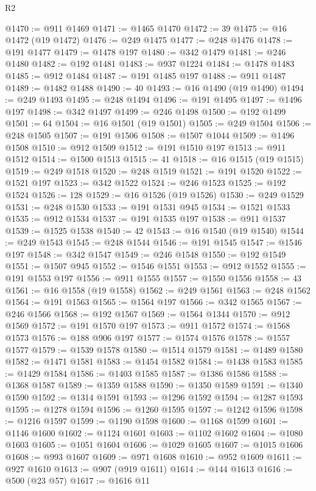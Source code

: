 \begin{lexlean}{R2}
\begin{coremodule}
@1470 := @911 @1469
@1471 := @1465 @1470
@1472 := 39
@1475 := @16 @1472 (@19 @1472)
@1476 := @249 @1475
@1477 := @248 @1476
@1478 := @191 @1477
@1479 := @1478 @197
@1480 := @342 @1479
@1481 := @246 @1480
@1482 := @192 @1481
@1483 := @937 @1224
@1484 := @1478 @1483
@1485 := @912 @1484
@1487 := @191 @1485 @197
@1488 := @911 @1487
@1489 := @1482 @1488
@1490 := 40
@1493 := @16 @1490 (@19 @1490)
@1494 := @249 @1493
@1495 := @248 @1494
@1496 := @191 @1495
@1497 := @1496 @197
@1498 := @342 @1497
@1499 := @246 @1498
@1500 := @192 @1499
@1501 := 64
@1504 := @16 @1501 (@19 @1501)
@1505 := @249 @1504
@1506 := @248 @1505
@1507 := @191 @1506
@1508 := @1507 @1044
@1509 := @1496 @1508
@1510 := @912 @1509
@1512 := @191 @1510 @197
@1513 := @911 @1512
@1514 := @1500 @1513
@1515 := 41
@1518 := @16 @1515 (@19 @1515)
@1519 := @249 @1518
@1520 := @248 @1519
@1521 := @191 @1520
@1522 := @1521 @197
@1523 := @342 @1522
@1524 := @246 @1523
@1525 := @192 @1524
@1526 := 128
@1529 := @16 @1526 (@19 @1526)
@1530 := @249 @1529
@1531 := @248 @1530
@1533 := @191 @1531 @945
@1534 := @1521 @1533
@1535 := @912 @1534
@1537 := @191 @1535 @197
@1538 := @911 @1537
@1539 := @1525 @1538
@1540 := 42
@1543 := @16 @1540 (@19 @1540)
@1544 := @249 @1543
@1545 := @248 @1544
@1546 := @191 @1545
@1547 := @1546 @197
@1548 := @342 @1547
@1549 := @246 @1548
@1550 := @192 @1549
@1551 := @1507 @945
@1552 := @1546 @1551
@1553 := @912 @1552
@1555 := @191 @1553 @197
@1556 := @911 @1555
@1557 := @1550 @1556
@1558 := 43
@1561 := @16 @1558 (@19 @1558)
@1562 := @249 @1561
@1563 := @248 @1562
@1564 := @191 @1563
@1565 := @1564 @197
@1566 := @342 @1565
@1567 := @246 @1566
@1568 := @192 @1567
@1569 := @1564 @1344
@1570 := @912 @1569
@1572 := @191 @1570 @197
@1573 := @911 @1572
@1574 := @1568 @1573
@1576 := @188 @906 @197
@1577 := @1574 @1576
@1578 := @1557 @1577
@1579 := @1539 @1578
@1580 := @1514 @1579
@1581 := @1489 @1580
@1582 := @1471 @1581
@1583 := @1454 @1582
@1584 := @1438 @1583
@1585 := @1429 @1584
@1586 := @1403 @1585
@1587 := @1386 @1586
@1588 := @1368 @1587
@1589 := @1359 @1588
@1590 := @1350 @1589
@1591 := @1340 @1590
@1592 := @1314 @1591
@1593 := @1296 @1592
@1594 := @1287 @1593
@1595 := @1278 @1594
@1596 := @1260 @1595
@1597 := @1242 @1596
@1598 := @1216 @1597
@1599 := @1190 @1598
@1600 := @1168 @1599
@1601 := @1146 @1600
@1602 := @1124 @1601
@1603 := @1102 @1602
@1604 := @1080 @1603
@1605 := @1051 @1604
@1606 := @1029 @1605
@1607 := @1015 @1606
@1608 := @993 @1607
@1609 := @971 @1608
@1610 := @952 @1609
@1611 := @927 @1610
@1613 := @907 (@919 @1611)
@1614 := @144 @1613
@1616 := @500 (@23 @57)
@1617 := @1616 @11

\end{coremodule}
\end{lexlean}

